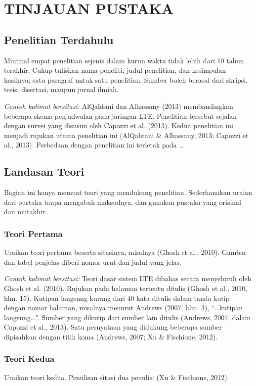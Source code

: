 \chapter{TINJAUAN PUSTAKA}

\section{Penelitian Terdahulu}
Minimal empat penelitian sejenis dalam kurun waktu tidak lebih dari 10 tahun terakhir. Cukup tuliskan nama peneliti, judul penelitian, dan kesimpulan hasilnya; satu paragraf untuk satu penelitian. Sumber boleh berasal dari skripsi, tesis, disertasi, maupun jurnal ilmiah.

\textit{Contoh kalimat bersitasi:} AlQahtani dan Alhassany (2013) membandingkan beberapa skema penjadwalan pada jaringan LTE. Penelitian tersebut sejalan dengan survei yang disusun oleh Capozzi et al. (2013). Kedua penelitian ini menjadi rujukan utama penelitian ini (AlQahtani \& Alhassany, 2013; Capozzi et al., 2013). Perbedaan dengan penelitian ini terletak pada …

\section{Landasan Teori}
Bagian ini hanya memuat teori yang mendukung penelitian. Sederhanakan uraian dari pustaka tanpa mengubah maksudnya, dan gunakan pustaka yang orisinal dan mutakhir.

\subsection{Teori Pertama}
Uraikan teori pertama beserta sitasinya, misalnya (Ghosh et al., 2010). Gambar dan tabel penjelas diberi nomor urut dan judul yang jelas.

\textit{Contoh kalimat bersitasi:} Teori dasar sistem LTE dibahas secara menyeluruh oleh Ghosh et al. (2010). Rujukan pada halaman tertentu ditulis (Ghosh et al., 2010, hlm. 15). Kutipan langsung kurang dari 40 kata ditulis dalam tanda kutip dengan nomor halaman, misalnya menurut Andrews (2007, hlm. 3), “…kutipan langsung…”. Sumber yang dikutip dari sumber lain ditulis (Andrews, 2007, dalam Capozzi et al., 2013). Satu pernyataan yang didukung beberapa sumber dipisahkan dengan titik koma (Andrews, 2007; Xu \& Fischione, 2012).

\subsection{Teori Kedua}
Uraikan teori kedua. Penulisan sitasi dua penulis: (Xu \& Fischione, 2012).

